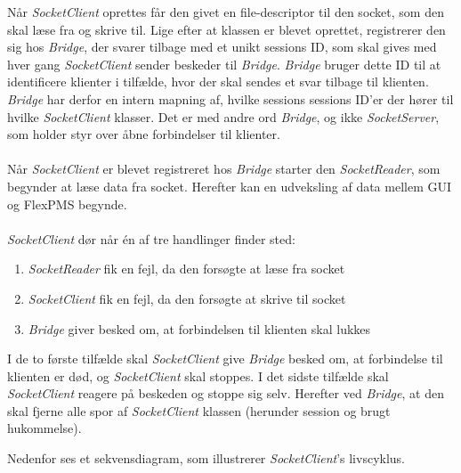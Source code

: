 Når \textit{SocketClient} oprettes får den givet en file-descriptor til den socket, som den skal læse fra og skrive til. Lige efter at klassen er blevet oprettet, registrerer den sig hos \textit{Bridge}, der svarer tilbage med et unikt sessions ID, som skal gives med hver gang \textit{SocketClient} sender beskeder til \textit{Bridge}. \textit{Bridge} bruger dette ID til at identificere klienter i tilfælde, hvor der skal sendes et svar tilbage til klienten. \textit{Bridge} har derfor en intern mapning af, hvilke sessions sessions ID'er der hører til hvilke \textit{SocketClient} klasser. Det er med andre ord \textit{Bridge}, og ikke \textit{SocketServer}, som holder styr over åbne forbindelser til klienter.\\\\

Når \textit{SocketClient} er blevet registreret hos \textit{Bridge} starter den \textit{SocketReader}, som begynder at læse data fra socket. Herefter kan en udveksling af data mellem GUI og FlexPMS begynde.\\\\

\textit{SocketClient} dør når én af tre handlinger finder sted:

\begin{enumerate}
\item \textit{SocketReader} fik en fejl, da den forsøgte at læse fra socket
\item \textit{SocketClient} fik en fejl, da den forsøgte at skrive til socket
\item \textit{Bridge} giver besked om, at forbindelsen til klienten skal lukkes 
\end{enumerate}

I de to første tilfælde skal \textit{SocketClient} give \textit{Bridge} besked om, at forbindelse til klienten er død, og \textit{SocketClient} skal stoppes. I det sidste tilfælde skal \textit{SocketClient} reagere på beskeden og stoppe sig selv. Herefter ved \textit{Bridge}, at den skal fjerne alle spor af \textit{SocketClient} klassen (herunder session og brugt hukommelse).


Nedenfor ses et sekvensdiagram, som illustrerer \textit{SocketClient}'s livscyklus.

